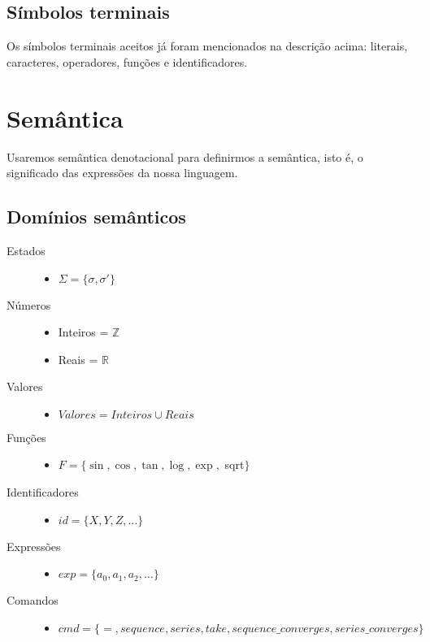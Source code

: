 \documentclass[a4 paper, 12pt]{article}
\begin{document}
\subsection{S\'imbolos terminais}
Os s\'imbolos terminais aceitos j\'a foram mencionados na descri\c
c\~ao acima: literais, caracteres, operadores, fun\c c\~oes e
identificadores.

\section{Sem\^antica}
Usaremos sem\^antica denotacional para definirmos a sem\^antica, isto
\'e, o significado das express\~oes da nossa linguagem.

\subsection{Dom\'inios sem\^anticos}
\begin{description}
\item[Estados]\hfill
  \begin{itemize}
  \item $\Sigma = \{\sigma, \sigma '\}$
  \end{itemize}
\item[N\'umeros]\hfill
  \begin{itemize}
  \item Inteiros = $\mathbb{Z}$
  \item Reais = $\mathbb{R}$
  \end{itemize}
\item[Valores]\hfill
  \begin{itemize}
  \item $Valores = Inteiros \cup Reais$
  \end{itemize}
\item[Fun\c c\~oes]\hfill
  \begin{itemize}
  \item $F = \{\sin, \cos, \tan, \log, \exp,$ sqrt$\}$
  \end{itemize}
\item[Identificadores]\hfill
  \begin{itemize}
  \item $id = \{X, Y, Z, \ldots\}$
  \end{itemize}
\item[Express\~oes]\hfill
  \begin{itemize}
  \item $exp = \{a_0, a_1, a_2, \ldots\}$
  \end{itemize}
\item[Comandos]\hfill
  \begin{itemize}
  \item $cmd = \{=, sequence, series, take, sequence\_converges,
    series\_converges\}$
  \end{itemize}
\end{description}
\end{document}
